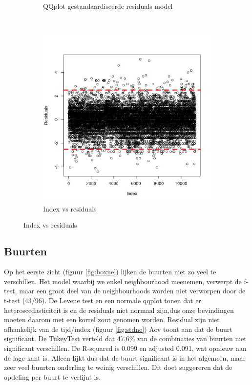 \documentclass[a4paper,kulak]{kulakarticle} %
\begin{document}
\begin{figure}[H]
\begin{subfigure}[b]{0.3\textwidth}
		\caption{QQplot gestandaardiseerde residuals model}
		\label{fig:qqboxcit}
	\end{subfigure}
	~
	\begin{subfigure}[b]{0.3\textwidth}
		\includegraphics[width=\textwidth]{indc.jpg}
		\caption{Index vs residuals}
		\label{fig:indc}
	\end{subfigure}
\end{figure}

\subsection{Buurten}
Op het eerste zicht (figuur \ref{fig:boxne}) lijken de buurten niet zo veel te verschillen.
Het model waarbij we enkel neighbourhood meenemen, verwerpt de f-test, maar een groot deel van de neighbourhoods worden niet verworpen door de t-test (43/96). 
De Levene test en een normale qqplot tonen dat er heteroscedasticiteit is en de residuals niet normaal zijn,dus onze bevindingen moeten daarom met een korrel zout genomen worden.
Residual zijn niet afhankelijk van de tijd/index (figuur \ref{fig:stdne})
Aov toont aan dat de buurt significant.
De TukeyTest verteld dat 47,6\% van de combinaties van buurten  niet significant verschillen.
De R-squared is 0.099 en adjusted 0.091, wat opnieuw aan de lage kant is.
Alleen lijkt dus dat de buurt significant is in het algemeen, maar zeer veel buurten onderling te weinig verschillen.
Dit doet suggereren dat de opdeling per buurt te verfijnt is.
\end{document}
